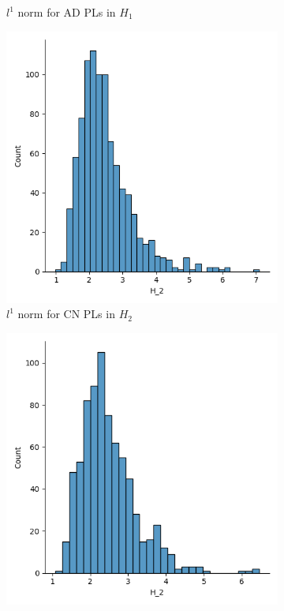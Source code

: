 \documentclass{article}
\begin{document}
\begin{figure}
\begin{subfigure}{0.3\textwidth}
    \caption{$l^1$ norm for AD PLs in $H_1$}
  \end{subfigure}
  \begin{subfigure}{0.3\textwidth}
    \includegraphics[width=\textwidth]{figures/average_pls/average_pl_CN_H_2.png}
    \caption{$l^1$ norm for CN PLs in $H_2$}
  \end{subfigure}
  \begin{subfigure}{0.3\textwidth}
    \includegraphics[width=\textwidth]{figures/average_pls/average_pl_MCI_H_2.png}

\end{subfigure}
\end{figure}
\end{document}
